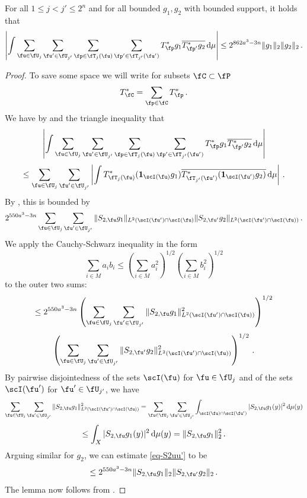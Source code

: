 \begin{lemma}
    \label{row-correlation}
    \leanok
    For all $1 \le j < j' \le 2^n$ and for all bounded $g_1, g_2$ with bounded support, it holds that
    $$
        \left| \int \sum_{\fu \in \fU_j} \sum_{\fu' \in \fU_{j'}} \sum_{\fp \in \fT_j(\fu)} \sum_{\fp' \in \fT_{j'}(\fu')} T^*_{\fp} g_1 \overline{T^*_{\fp'} g_2} \, \mathrm{d}\mu \right| \le
        2^{862a^3-3n}\|g_1\|_2 \|g_2\|_2\,.
    $$
\end{lemma}

\begin{proof}
    To save some space we will write for subsets $\fC \subset \fP$
    $$
        T_{\fC}^* = \sum_{\fp \in \fC} T_{\fp}^*\,.
    $$
    We have by  and the triangle inequality that
    $$
        \left| \int \sum_{\fu \in \fU_j} \sum_{\fu' \in \fU_{j'}} \sum_{\fp \in \fT_j(\fu)} \sum_{\fp' \in \fT_{j'}(\fu')} T^*_{\fp} g_1 \overline{T^*_{\fp'} g_2} \, \mathrm{d}\mu \right|
    $$
    $$
        \le \sum_{\fu \in \fU_j} \sum_{\fu' \in \fU_{j'}} \left| \int T^*_{\fT_j(\fu)} (\mathbf{1}_{\scI(\fu)} g_1) \overline{T^*_{\fT_{j'}(\fu')} (\mathbf{1}_{\scI(\fu')} g_2)} \, \mathrm{d}\mu \right|\,.
    $$
    By , this is bounded by
    \begin{equation}
        \label{eq-S2uu'}
         2^{550a^3-3n} \sum_{\fu \in \fU_j} \sum_{\fu' \in \fU_{j'}} \|S_{2,\fu} g_1\|_{L^2(\scI(\fu')\cap \scI(\fu)} \|S_{2, \fu'} g_2\|_{L^2(\scI(\fu')\cap\scI(\fu))}\,.
    \end{equation}
    We apply the Cauchy-Schwarz inequality in the form
    \begin{equation*}
        \sum_{i \in M} a_i b_i \le (\sum_{i \in M} a_i^2 )^{1/2}(\sum_{i \in M} b_i^2 )^{1/2}
    \end{equation*} to the outer two sums:
    $$
        \le 2^{550a^3-3n} \left(\sum_{\fu \in \fU_j} \sum_{\fu' \in \fU_{j'}} \|S_{2,\fu} g_1\|_{L^2(\scI(\fu')\cap \scI(\fu))}^2 \right)^{1/2}
    $$
    $$
        \left(\sum_{\fu \in \fU_j} \sum_{\fu' \in \fU_{j'}} \|S_{2,\fu'} g_2\|_{L^2(\scI(\fu')\cap\scI(\fu))}^2 \right)^{1/2}\,.
    $$
    By pairwise disjointedness of the sets $\scI(\fu)$ for $\fu \in \fU_j$ and of the sets $\scI(\fu')$ for $\fu' \in \fU_{j'}$, we have
    $$
        \sum_{\fu \in \fU_j}\sum_{\fu' \in \fU_{j'}} \|S_{2,\fu} g_1\|_{L^2(\scI(\fu')\cap \scI(\fu))}^2
        = \sum_{\fu \in \fU_j}\sum_{\fu' \in \fU_{j'}} \int_{\scI(\fu) \cap \scI(\fu')} |S_{2,\fu} g_1(y)|^2 \, \mathrm{d}\mu(y)
    $$
    $$
        \le \int_X |S_{2,\fu}g_1(y)|^2 \, \mathrm{d}\mu(y) = \|S_{2,\fu} g_1\|_2^2\,.
    $$
    Arguing similar for $g_2$, we can estimate \eqref{eq-S2uu'} to be
    $$
        \le 2^{550a^3-3n} \|S_{2,\fu}g_1\|_2 \|S_{2,\fu'} g_2\|_2\,.
    $$
    The lemma now follows from .
\end{proof}

